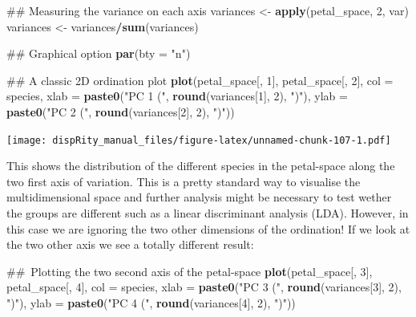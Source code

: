 \documentclass[]{book}
\newenvironment{Shaded}{\begin{snugshade}}{\end{snugshade}}
\newcommand{\KeywordTok}[1]{\textcolor[rgb]{0.13,0.29,0.53}{\textbf{#1}}}
\newcommand{\DataTypeTok}[1]{\textcolor[rgb]{0.13,0.29,0.53}{#1}}
\newcommand{\DecValTok}[1]{\textcolor[rgb]{0.00,0.00,0.81}{#1}}
\newcommand{\StringTok}[1]{\textcolor[rgb]{0.31,0.60,0.02}{#1}}
\newcommand{\OperatorTok}[1]{\textcolor[rgb]{0.81,0.36,0.00}{\textbf{#1}}}
\newcommand{\NormalTok}[1]{#1}
\theoremstyle{definition}
\theoremstyle{definition}
\theoremstyle{remark}
\begin{document}
\begin{Shaded}
\begin{Highlighting}[]
\NormalTok{## Measuring the variance on each axis}
\NormalTok{variances <-}\StringTok{ }\KeywordTok{apply}\NormalTok{(petal_space, }\DecValTok{2}\NormalTok{, var)}
\NormalTok{variances <-}\StringTok{ }\NormalTok{variances}\OperatorTok{/}\KeywordTok{sum}\NormalTok{(variances)}

\NormalTok{## Graphical option}
\KeywordTok{par}\NormalTok{(}\DataTypeTok{bty =} \StringTok{"n"}\NormalTok{)}

\NormalTok{## A classic 2D ordination plot}
\KeywordTok{plot}\NormalTok{(petal_space[, }\DecValTok{1}\NormalTok{], petal_space[, }\DecValTok{2}\NormalTok{], }\DataTypeTok{col =}\NormalTok{ species,}
    \DataTypeTok{xlab =} \KeywordTok{paste0}\NormalTok{(}\StringTok{"PC 1 ("}\NormalTok{, }\KeywordTok{round}\NormalTok{(variances[}\DecValTok{1}\NormalTok{], }\DecValTok{2}\NormalTok{), }\StringTok{")"}\NormalTok{),}
    \DataTypeTok{ylab =} \KeywordTok{paste0}\NormalTok{(}\StringTok{"PC 2 ("}\NormalTok{, }\KeywordTok{round}\NormalTok{(variances[}\DecValTok{2}\NormalTok{], }\DecValTok{2}\NormalTok{), }\StringTok{")"}\NormalTok{))}
\end{Highlighting}
\end{Shaded}

\texttt{[image: dispRity\_manual\_files/figure-latex/unnamed-chunk-107-1.pdf]}

This shows the distribution of the different species in the petal-space
along the two first axis of variation. This is a pretty standard way to
visualise the multidimensional space and further analysis might be
necessary to test wether the groups are different such as a linear
discriminant analysis (LDA). However, in this case we are ignoring the
two other dimensions of the ordination! If we look at the two other axis
we see a totally different result:

\begin{Shaded}
\begin{Highlighting}[]
\NormalTok{## Plotting the two second axis of the petal-space}
\KeywordTok{plot}\NormalTok{(petal_space[, }\DecValTok{3}\NormalTok{], petal_space[, }\DecValTok{4}\NormalTok{], }\DataTypeTok{col =}\NormalTok{ species,}
    \DataTypeTok{xlab =} \KeywordTok{paste0}\NormalTok{(}\StringTok{"PC 3 ("}\NormalTok{, }\KeywordTok{round}\NormalTok{(variances[}\DecValTok{3}\NormalTok{], }\DecValTok{2}\NormalTok{), }\StringTok{")"}\NormalTok{),}
    \DataTypeTok{ylab =} \KeywordTok{paste0}\NormalTok{(}\StringTok{"PC 4 ("}\NormalTok{, }\KeywordTok{round}\NormalTok{(variances[}\DecValTok{4}\NormalTok{], }\DecValTok{2}\NormalTok{), }\StringTok{")"}\NormalTok{))}
\end{Highlighting}
\end{Shaded}
\end{document}
